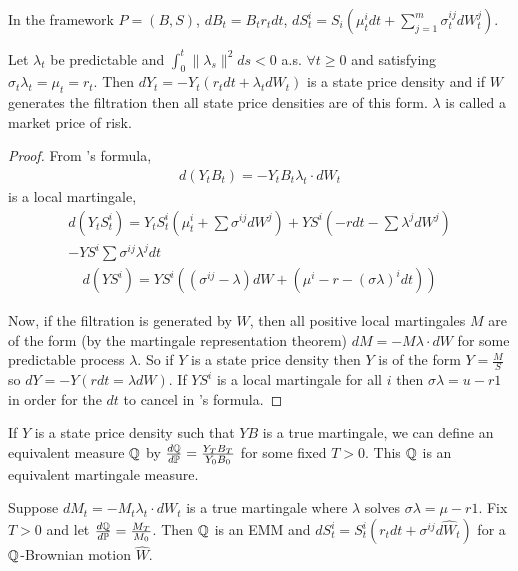 
In the framework $P = (B, S)$, $dB_{t} = B_{t} r_{t} dt$, $dS^{i}_{t} =
S_{i}(\mu^{i}_{t} dt + \sum_{j=1}^{m} \sigma^{ij}_{t} dW^{j}_{t})$. 

\begin{thm}
  \label{defn:continuous_time:30}
  Let $\lambda_{t}$ be predictable and $\int_{0}^{t} \| \lambda_{s}
  \|^{2} ds < 0$ a.s. $\forall t \geq 0$ and satisfying $\sigma_{t}
  \lambda_{t} = \mu_{t} = r_{t}$.  Then $dY_{t} = -Y_{t}(r_{t} dt +
  \lambda_{t} dW_{t})$ is a state price density and if $W$ generates
  the filtration then all state price densities are of this form.
  $\lambda$ is called a market price of risk.
\end{thm}

\begin{proof}
  From \ito's formula,
  \begin{align}
    \label{eq:75}
    d(Y_{t} B_{t}) = -Y_{t} B_{t} \lambda_{t} \cdot dW_{t}
  \end{align} is a local martingale,
  \begin{multline}
    \label{eq:76}
    d(Y_{t} S_{t}^{i}) = Y_{t}S_{t}^{i}(\mu^{i}_{t} + \sum \sigma^{ij}
    dW^{j}) + YS^{i}(-r dt - \sum \lambda^{j} dW^{j}) \\
    - Y S^{i} \sum \sigma^{ij} \lambda^{j} dt
  \end{multline}
  \begin{multline}
    \label{eq:155}
    d(YS^{i}) = YS^{i}((\sigma^{ij} - \lambda) dW + (\mu^{i} - r -
    (\sigma \lambda)^{i} dt))
  \end{multline}

  Now, if the filtration is generated by $W$, then all positive local
  martingales $M$ are of the form (by the martingale representation
  theorem) $dM = -M \lambda \cdot dW$ for some predictable process
  $\lambda$.  So if $Y$ is a state price density then $Y$ is of the
  form $Y = \frac{M}{S}$ so $dY = - Y(rdt = \lambda dW)$.  If $YS^{i}$
  is a local martingale for all $i$ then $\sigma \lambda = u - r1$ in
  order for the $dt$ to cancel in \ito's formula.
\end{proof}

If $Y$ is a state price density such that $YB$ is a true martingale,
we can define an equivalent measure $\Q$ by $\frac{d\Q}{d\Prob} =
\frac{Y_{T} B_{T}}{Y_{0} B_{0}}$ for some fixed $T > 0$.  This $\Q$ is
an equivalent martingale measure.

\begin{thm}
  \label{defn:continuous_time:31}
  Suppose $dM_{t} = -M_{t} \lambda_{t} \cdot dW_{t}$ is a true
  martingale where $\lambda$ solves $\sigma \lambda = \mu - r1$.  Fix
  $T > 0$ and let $\frac{d\Q}{d\Prob} = \frac{M_{T}}{M_{0}}$.  Then
  $\Q$ is an EMM and $dS_{t}^{i} = S_{t}^{i}(r_{t} dt + \sigma^{ij}
  d\hat W_{t})$ for a $\Q$-Brownian motion $\hat W$.
\end{thm}


